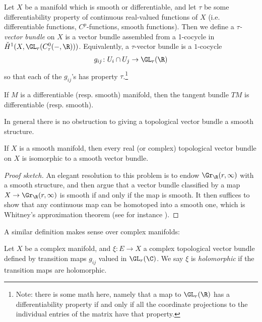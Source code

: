 \documentclass[11pt]{book}
\begin{document}
\begin{definition}\label{def:differentiable-vector-bundle} 
Let $X$ be a manifold which is smooth or differentiable, and let $\tau$ be some differentiability property of continuous real-valued functions of $X$ (i.e. differentiable functions, $C^p$-functions, smooth functions). Then we define a \emph{$\tau$-vector bundle} on $X$ is a vector bundle assembled from a 1-cocycle in $\check{H}^1(X, \GL_r(C^0_\tau(-,\R)))$. Equivalently, a $\tau$-vector bundle is a $1$-cocycle
\begin{align*}
    g_{ij} \colon U_i \cap U_j \to \GL_r(\R)
\end{align*}
so that each of the $g_{ij}$'s has property $\tau$.\footnote{Note: there is some math here, namely that a map to $\GL_r(\R)$ has a differentiability property if and only if all the coordinate projections to the individual entries of the matrix have that property.}
\end{definition}


\begin{example} If $M$ is a differentiable (resp. smooth) manifold, then the tangent bundle $TM$ is differentiable (resp. smooth).
\end{example}

In general there is no obstruction to giving a topological vector bundle a smooth structure.

\begin{proposition} If $X$ is a smooth manifold, then every real (or complex) topological vector bundle on $X$ is isomorphic to a smooth vector bundle.
\end{proposition}
\begin{proof}[Proof sketch] An elegant resolution to this problem is to endow $\Gr_\R(r,\infty)$ with a smooth structure, and then argue that a vector bundle classified by a map $X \to \Gr_\R(r,\infty)$ is smooth if and only if the map is smooth. It then suffices to show that any continuous map can be homotoped into a smooth one, which is Whitney's approximation theorem (see for instance \cite[10.16]{leeIntroductionSmoothManifolds2012}).
\end{proof}

A similar definition makes sense over complex manifolds:

\begin{definition}\label{def:holomorphic-vector-bundle} Let $X$ be a complex manifold, and $\xi \colon E \to X$ a complex topological vector bundle defined by transition maps $g_{ij}$ valued in $\GL_r(\C)$. We say $\xi$ is \emph{holomorphic} if the transition maps are holomorphic.
\end{definition}
\end{document}
